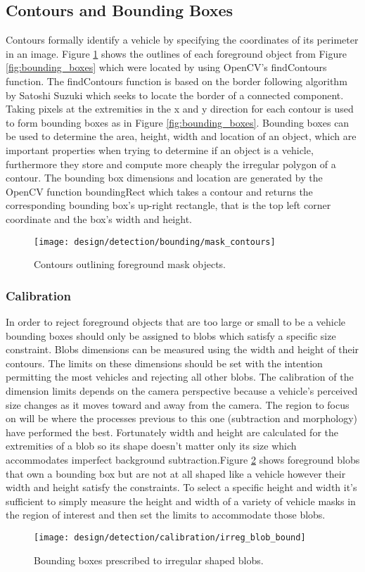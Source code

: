 
\subsection{Contours and Bounding Boxes}

Contours formally identify a vehicle by specifying the coordinates of its perimeter in an image. Figure \ref{fig:contour_polygon} shows the outlines of each foreground object from Figure \ref{fig:bounding_boxes} which were located by using OpenCV's findContours function. The findContours function is based on the border following algorithm by Satoshi Suzuki \cite{satoshi_findContours} which seeks to locate the border of a connected component. Taking pixels at the extremities in the x and y direction for each contour is used to form bounding boxes as in Figure \ref{fig:bounding_boxes}. Bounding boxes can be used to determine the area, height, width and location of an object, which are important properties when trying to determine if an object is a vehicle, furthermore they store and compute more cheaply the irregular polygon of a contour. The bounding box dimensions and location are generated by the OpenCV function boundingRect which takes a contour and returns the corresponding bounding box's up-right rectangle, that is the top left corner coordinate and the box's width and height. 


\begin{figure}[H]
    \centering
    \centering\texttt{[image: design/detection/bounding/mask\_contours]}
    \caption{Contours outlining foreground mask objects.}
    \label{fig:contour_polygon}
\end{figure}

\subsubsection{Calibration}

In order to reject foreground objects that are too large or small to be a vehicle bounding boxes should only be assigned to blobs which satisfy a specific size constraint. Blobs dimensions can be measured using the width and height of their contours. The limits on these dimensions should be set with the intention permitting the most vehicles and rejecting all other blobs. The calibration of the dimension limits depends on the camera perspective because a vehicle's perceived size changes as it moves toward and away from the camera. The region to focus on will be where the processes previous to this one (subtraction and morphology) have performed the best. Fortunately width and height are calculated for the extremities of a blob so its shape doesn't matter only its size which accommodates imperfect background subtraction.Figure \ref{fig:irreg_blob} shows foreground blobs that own a bounding box but are not at all shaped like a vehicle however their width and height satisfy the constraints. To select a specific height and width it's sufficient to simply measure the height and width of a variety of vehicle masks in the region of interest and then set the limits to accommodate those blobs. 


\begin{figure}[H]
    \centering
    \centering\texttt{[image: design/detection/calibration/irreg\_blob\_bound]}
    \caption{Bounding boxes prescribed to irregular shaped blobs.}
    \label{fig:irreg_blob}
  \end{figure}

  

  
